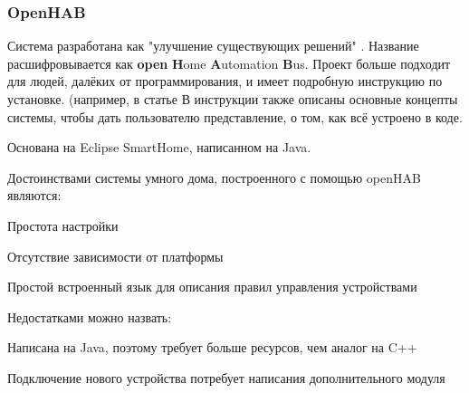 \subsubsection{OpenHAB}

Система разработана как "улучшение существующих решений" \cite{OpenHABDoc}.
Название расшифровывается как \textbf{open} \textbf{H}ome \textbf{A}utomation \textbf{B}us.
Проект больше подходит для людей, далёких от программирования, и имеет подробную инструкцию по установке.
(например, в статье \cite[Keeping Eyes on your Home]{OpenHABArticle}
В инструкции также описаны основные концепты системы, чтобы дать пользователю представление, о том, как всё устроено в коде.

Основана на Eclipse SmartHome, написанном на Java.

Достоинствами системы умного дома, построенного с помощью openHAB являются:
\begin{list}{}{}
    \item Простота настройки
    \item Отсутствие зависимости от платформы
    \item Простой встроенный язык для описания правил управления устройствами
\end{list}
Недостатками можно назвать:
\begin{list}{}{}
    \item Написана на Java, поэтому требует больше ресурсов, чем аналог на C++
    \item Подключение нового устройства потребует написания дополнительного модуля
\end{list}
